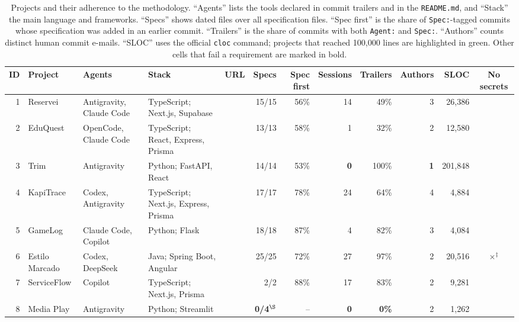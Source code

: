 \documentclass[conference]{IEEEtran}
\begin{document}
\begin{table}[t]
\centering
\caption{Projects and their adherence to the methodology. ``Agents'' lists the tools declared in commit trailers and in the \texttt{README.md}, and ``Stack'' the main language and frameworks. ``Specs'' shows dated files over all specification files. ``Spec first'' is the share of \texttt{Spec:}-tagged commits whose specification was added in an earlier commit. ``Trailers'' is the share of commits with both \texttt{Agent:} and \texttt{Spec:}. ``Authors'' counts distinct human commit e-mails. ``SLOC'' uses the official \texttt{cloc} command; projects that reached 100,000 lines are highlighted in green. Other cells that fail a requirement are marked in bold.}
\label{tab:adherence}
\footnotesize
\renewcommand{\arraystretch}{1.15}
\setlength{\tabcolsep}{3pt}
\newcommand{\yes}{\checkmark}
\newcommand{\no}{\textbf{$\times$}}
\begin{tabularx}{\textwidth}{@{}r l >{\raggedright\arraybackslash}p{2.9cm} >{\raggedright\arraybackslash}X c r r r r r r c@{}}
\toprule
\textbf{ID} & \textbf{Project} & \textbf{Agents} & \textbf{Stack} & \textbf{URL} & \textbf{Specs} & \textbf{Spec first} & \textbf{Sessions} & \textbf{Trailers} & \textbf{Authors} & \textbf{SLOC} & \textbf{No secrets} \\
\midrule
1 & Reservei & Antigravity, Claude Code & TypeScript; Next.js, Supabase & \yes & 15/15 & 56\% & 14 & 49\% & 3 & 26,386 & \yes \\
2 & EduQuest & OpenCode, Claude Code & TypeScript; React, Express, Prisma & \yes & 13/13 & 58\% & 1 & 32\% & 2 & 12,580 & \yes \\
3 & Trim & Antigravity & Python; FastAPI, React & \yes & 14/14 & 53\% & \textbf{0} & 100\% & \textbf{1} & \cellcolor{green!25}201,848 & \yes \\
4 & KapiTrace & Codex, Antigravity & TypeScript; Next.js, Express, Prisma & \yes & 17/17 & 78\% & 24 & 64\% & 4 & 4,884 & \yes \\
5 & GameLog & Claude Code, Copilot & Python; Flask & \yes & 18/18 & 87\% & 4 & 82\% & 3 & 4,084 & \yes \\
6 & Estilo Marcado & Codex, DeepSeek & Java; Spring Boot, Angular & \yes & 25/25 & 72\% & 27 & 97\% & 2 & 20,516 & \no$^{\ddagger}$ \\
7 & ServiceFlow & Copilot & TypeScript; Next.js, Prisma & \yes & 2/2 & 88\% & 17 & 83\% & 2 & 9,281 & \yes \\
8 & Media Play & Antigravity & Python; Streamlit & \yes & \textbf{0/4}$^{\S}$ & -- & \textbf{0} & \textbf{0\%} & 2 & 1,262 & \yes \\

\end{tabularx}
\end{table}
\end{document}
